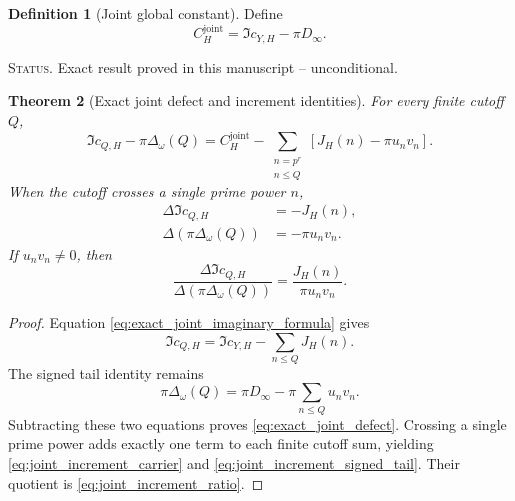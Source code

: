 \documentclass[11pt]{amsart}
\numberwithin{equation}{section}
\theoremstyle{plain}
\newtheorem{theorem}{Theorem}[section]
\theoremstyle{definition}
\newtheorem{definition}[theorem]{Definition}
\theoremstyle{remark}
\newcommand{\1}{\mathbf{1}}
\newcommand{\statusnote}[1]{%
  \par\smallskip\noindent
  \begingroup\footnotesize\textsc{Status.} #1\endgroup
  \par\smallskip}
\begin{document}
\begin{definition}[Joint global constant]
\label{def:joint_global_constant}
Define
\begin{equation}
C_H^{\mathrm{joint}}
=
\Im c_{Y,H}-\pi D_\infty.
\label{eq:joint_global_constant}
\end{equation}
\end{definition}

\statusnote{Exact result proved in this manuscript -- unconditional.}
\begin{theorem}[Exact joint defect and increment identities]
\label{thm:exact_joint_defect_increment}
For every finite cutoff \(Q\),
\begin{equation}
\boxed{
\Im c_{Q,H}-\pi\Delta_\omega(Q)
=
C_H^{\mathrm{joint}}
-
\sum_{\substack{n=p^r\\n\leq Q}}
\left[J_H(n)-\pi u_nv_n\right].
}
\label{eq:exact_joint_defect}
\end{equation}
When the cutoff crosses a single prime power \(n\),
\begin{align}
\Delta\Im c_{Q,H}
&=
-J_H(n),
\label{eq:joint_increment_carrier}
\\
\Delta\!\left(\pi\Delta_\omega(Q)\right)
&=
-\pi u_nv_n.
\label{eq:joint_increment_signed_tail}
\end{align}
If \(u_nv_n\neq0\), then
\begin{equation}
\boxed{
\frac{
\Delta\Im c_{Q,H}
}{
\Delta(\pi\Delta_\omega(Q))
}
=
\frac{J_H(n)}{\pi u_nv_n}.
}
\label{eq:joint_increment_ratio}
\end{equation}
\end{theorem}

\begin{proof}
Equation \eqref{eq:exact_joint_imaginary_formula} gives
\begin{equation}
\Im c_{Q,H}
=
\Im c_{Y,H}-\sum_{n\leq Q}J_H(n).
\label{eq:joint_defect_first_identity}
\end{equation}
The signed tail identity remains
\begin{equation}
\pi\Delta_\omega(Q)
=
\pi D_\infty-\pi\sum_{n\leq Q}u_nv_n.
\label{eq:joint_defect_second_identity}
\end{equation}
Subtracting these two equations proves
\eqref{eq:exact_joint_defect}.  Crossing a single prime power adds exactly
one term to each finite cutoff sum, yielding
\eqref{eq:joint_increment_carrier} and
\eqref{eq:joint_increment_signed_tail}.  Their quotient is
\eqref{eq:joint_increment_ratio}.
\end{proof}
\end{document}
